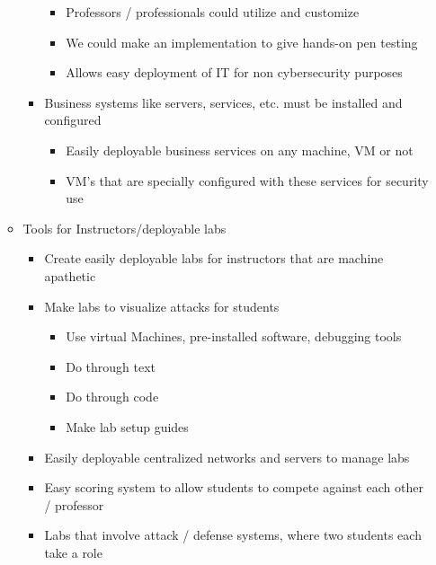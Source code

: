 \documentclass[openright]{report}
\begin{document}
\begin{appendices}
\begin{itemize}
\begin{itemize}
\begin{itemize}
                    \begin{itemize}
                        \item Professors / professionals could utilize and customize
                        \item We could make an implementation to give hands-on pen testing
                        \item Allows easy deployment of IT for non cybersecurity purposes
                    \end{itemize}
                \item Business systems like servers, services, etc. must be installed and configured
                    \begin{itemize}
                        \item Easily deployable business services on any machine, VM or not
                        \item VM's that are specially configured with these services for security use
                    \end{itemize}
            \end{itemize}
        \item Tools for Instructors/deployable labs
            \begin{itemize}
                \item Create easily deployable labs for instructors that are machine apathetic
                \item Make labs to visualize attacks for students
                    \begin{itemize}
                        \item Use virtual Machines, pre-installed software, debugging tools
                        \item Do through text
                        \item Do through code
                        \item Make lab setup guides
                    \end{itemize}
                \item Easily deployable centralized networks and servers to manage labs
                \item Easy scoring system to allow students to compete against each other / professor
                \item Labs that involve attack / defense systems, where two students each take a role
            \end{itemize}
    \end{itemize}

\end{itemize}
\end{appendices}
\end{document}
